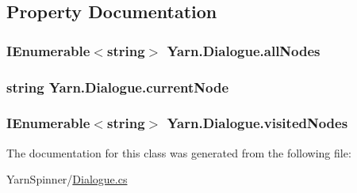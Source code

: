 \subsection{Property Documentation}
\hypertarget{a00050_a0ee573e3d072bccf98ba1d975612d42c}{
\subsubsection[{all\-Nodes}]{\setlength{\rightskip}{0pt plus 5cm}I\-Enumerable$<$string$>$ Yarn.\-Dialogue.\-all\-Nodes\hspace{0.3cm}{\ttfamily [get]}}}\label{a00050_a0ee573e3d072bccf98ba1d975612d42c}
\hypertarget{a00050_af368b5c342d585dc6953876c5965ccc8}{
\subsubsection[{current\-Node}]{\setlength{\rightskip}{0pt plus 5cm}string Yarn.\-Dialogue.\-current\-Node\hspace{0.3cm}{\ttfamily [get]}}}\label{a00050_af368b5c342d585dc6953876c5965ccc8}
\hypertarget{a00050_ac5661051e0b7f44527fe526c7766dbbf}{
\subsubsection[{visited\-Nodes}]{\setlength{\rightskip}{0pt plus 5cm}I\-Enumerable$<$string$>$ Yarn.\-Dialogue.\-visited\-Nodes\hspace{0.3cm}{\ttfamily [get]}}}\label{a00050_ac5661051e0b7f44527fe526c7766dbbf}


The documentation for this class was generated from the following file\-:\begin{DoxyCompactItemize}
\item 
Yarn\-Spinner/\hyperlink{a00138}{Dialogue.\-cs}\end{DoxyCompactItemize}
